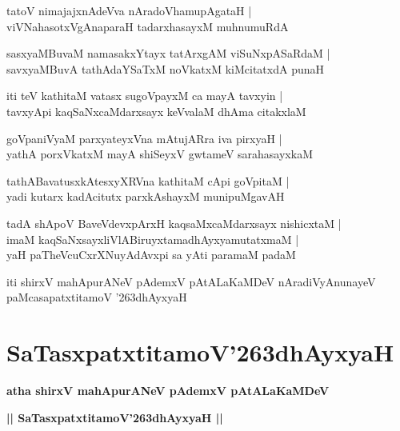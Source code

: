 \documentclass[twoside,12pt,openright]{book}
\def\S{\char'263}
\newcounter{shloka}[chapter]
\begin{document}
\begin{shloka}%
tatoV nimajajxnAdeVva nAradoVhamupAgataH |\\
viVNahasotxVgAnaparaH tadarxhasayxM muhnumuRdA 
\end{shloka}

\begin{shloka}%
sasxyaMBuvaM namasakxYtayx tatArxgAM viSuNxpASaRdaM |\\
savxyaMBuvA tathAdaYSaTxM noVkatxM kiMcitatxdA punaH 
\end{shloka}

\begin{shloka}%
iti teV kathitaM vatasx sugoVpayxM ca mayA tavxyin |\\
tavxyApi kaqSaNxcaMdarxsayx keVvalaM dhAma citakxlaM 
\end{shloka}

\begin{shloka}%
goVpaniVyaM parxyateyxVna mAtujARra iva pirxyaH |\\
yathA porxVkatxM mayA shiSeyxV gwtameV sarahasayxkaM  
\end{shloka}

\begin{shloka}%
tathABavatusxkAtesxyXRVna kathitaM cApi goVpitaM |\\
yadi kutarx kadAcitutx parxkAshayxM munipuMgavAH 
\end{shloka}

\begin{shloka}%
tadA shApoV BaveVdevxpArxH kaqsaMxcaMdarxsayx nishicxtaM |\\
imaM kaqSaNxsayxliVlABiruyxtamadhAyxyamutatxmaM |\\
yaH paTheVcuCxrXNuyAdAvxpi sa yAti paramaM padaM 
\end{shloka}

\begin{center}
iti shirxV mahApurANeV pAdemxV pAtALaKaMDeV nAradiVyAnunayeV   
paMcasapatxtitamoV \S dhAyxyaH
\end{center}

\chapter{SaTasxpatxtitamoV\S dhAyxyaH}

\begin{center}
{\LARGE\bfseries atha shirxV mahApurANeV pAdemxV pAtALaKaMDeV }
\end{center}

\begin{center}         
{\LARGE\bfseries || SaTasxpatxtitamoV\S dhAyxyaH ||}
\end{center}
\end{document}
